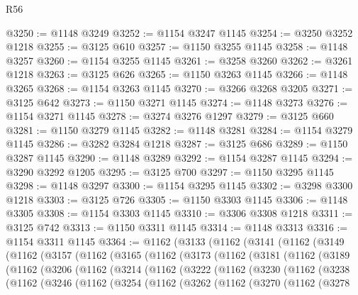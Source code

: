 \begin{lexlean}{R56}
\begin{coremodule}
@3250 := @1148 @3249
@3252 := @1154 @3247 @1145
@3254 := @3250 @3252 @1218
@3255 := @3125 @610
@3257 := @1150 @3255 @1145
@3258 := @1148 @3257
@3260 := @1154 @3255 @1145
@3261 := @3258 @3260
@3262 := @3261 @1218
@3263 := @3125 @626
@3265 := @1150 @3263 @1145
@3266 := @1148 @3265
@3268 := @1154 @3263 @1145
@3270 := @3266 @3268 @3205
@3271 := @3125 @642
@3273 := @1150 @3271 @1145
@3274 := @1148 @3273
@3276 := @1154 @3271 @1145
@3278 := @3274 @3276 @1297
@3279 := @3125 @660
@3281 := @1150 @3279 @1145
@3282 := @1148 @3281
@3284 := @1154 @3279 @1145
@3286 := @3282 @3284 @1218
@3287 := @3125 @686
@3289 := @1150 @3287 @1145
@3290 := @1148 @3289
@3292 := @1154 @3287 @1145
@3294 := @3290 @3292 @1205
@3295 := @3125 @700
@3297 := @1150 @3295 @1145
@3298 := @1148 @3297
@3300 := @1154 @3295 @1145
@3302 := @3298 @3300 @1218
@3303 := @3125 @726
@3305 := @1150 @3303 @1145
@3306 := @1148 @3305
@3308 := @1154 @3303 @1145
@3310 := @3306 @3308 @1218
@3311 := @3125 @742
@3313 := @1150 @3311 @1145
@3314 := @1148 @3313
@3316 := @1154 @3311 @1145
@3364 := @1162
    (@3133
      (@1162
        (@3141
          (@1162
            (@3149
              (@1162
                (@3157
                  (@1162
                    (@3165
                      (@1162
                        (@3173
                          (@1162
                            (@3181
                              (@1162
                                (@3189
                                  (@1162
                                    (@3206
                                      (@1162
                                        (@3214
                                          (@1162
                                            (@3222
                                              (@1162
                                                (@3230
                                                  (@1162
                                                    (@3238
                                                      (@1162
                                                        (@3246
                                                          (@1162
                                                            (@3254
                                                              (@1162
                                                                (@3262
                                                                  (@1162
                                                                    (@3270
                                                                      (@1162
                                                                        (@3278

\end{coremodule}
\end{lexlean}
